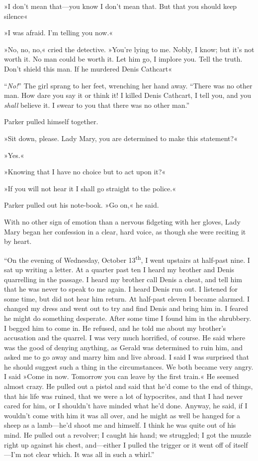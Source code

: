 »I don't mean that\allowbreak---\allowbreak you know I don't mean that. But that you should keep silence\longdash«

»I was afraid. I'm telling you now.«

»No, no, no,« cried the detective. »You're lying to me. Nobly, I know; but it's not worth it. No man could be worth it. Let him go, I implore you. Tell the truth. Don't shield this man. If he murdered Denis Cathcart\longdash«

\enquote{\textit{No!}} The girl sprang to her feet, wrenching her hand away. \enquote{There was no other man. How dare you say it or think it! I killed Denis Cathcart, I tell you, and you \textit{shall} believe it. I swear to you that there was no other man.}

Parker pulled himself together.

»Sit down, please. Lady Mary, you are determined to make this statement?«

»Yes.«

»Knowing that I have no choice but to act upon it?«

»If you will not hear it I shall go straight to the police.«

Parker pulled out his note-book. »Go on,« he said.

With no other sign of emotion than a nervous fidgeting with her gloves, Lady Mary began her confession in a clear, hard voice, as though she were reciting it by heart.

\enquote{On the evening of Wednesday, October 13\textsuperscript{th}, I went upstairs at half-past nine. I sat up writing a letter. At a quarter past ten I heard my brother and Denis quarrelling in the passage. I heard my brother call Denis a cheat, and tell him that he was never to speak to me again. I heard Denis run out. I listened for some time, but did not hear him return. At half-past eleven I became alarmed. I changed my dress and went out to try and find Denis and bring him in. I feared he might do something desperate. After some time I found him in the shrubbery. I begged him to come in. He refused, and he told me about my brother's accusation and the quarrel. I was very much horrified, of course. He said where was the good of denying anything, as Gerald was determined to ruin him, and asked me to go away and marry him and live abroad. I said I was surprised that he should suggest such a thing in the circumstances. We both became very angry. I said »Come in now.  Tomorrow you can leave by the first train.« He seemed almost crazy. He pulled out a pistol and said that he'd come to the end of things, that his life was ruined, that we were a lot of hypocrites, and that I had never cared for him, or I shouldn't have minded what he'd done. Anyway, he said, if I wouldn't come with him it was all over, and he might as well be hanged for a sheep as a lamb\allowbreak---\allowbreak he'd shoot me and himself. I think he was quite out of his mind. He pulled out a revolver; I caught his hand; we struggled; I got the muzzle right up against his chest, and\allowbreak---\allowbreak either I pulled the trigger or it went off of itself\allowbreak---\allowbreak I'm not clear which. It was all in such a whirl.}

